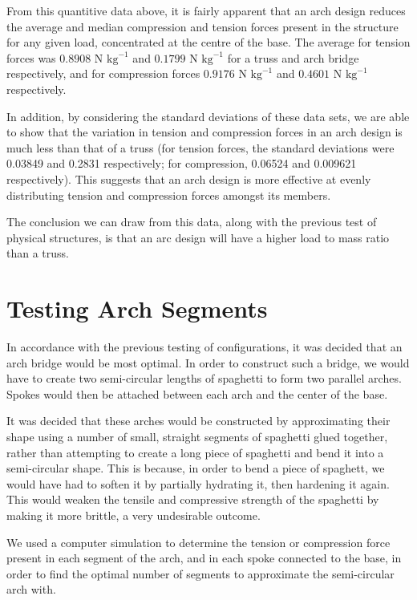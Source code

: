 \documentclass[a4paper,11pt]{article}
\begin{document}
From this quantitive data above, it is fairly apparent that an arch design
reduces the average and median compression and tension forces present in the
structure for any given load, concentrated at the centre of the base. The
average for tension forces was $0.8908\mbox{ N kg}^{-1}$ and
$0.1799\mbox{ N kg}^{-1}$ for a truss and arch bridge respectively, and for
compression forces $0.9176\mbox{ N kg}^{-1}$ and $0.4601\mbox{ N kg}^{-1}$
respectively.

In addition, by considering the standard deviations of these data sets, we are
able to show that the variation in tension and compression forces in an arch
design is much less than that of a truss (for tension forces, the standard
deviations were 0.03849 and 0.2831 respectively; for compression, 0.06524 and
0.009621 respectively).
This suggests that an arch design is more effective at evenly distributing
tension and compression forces amongst its members.

The conclusion we can draw from this data, along with the previous test of
physical structures, is that an arc design will have a higher load to mass ratio
than a truss.




\section{Testing Arch Segments}

In accordance with the previous testing of configurations, it was decided that
an arch bridge would be most optimal.
In order to construct such a bridge, we would have to create two semi-circular
lengths of spaghetti to form two parallel arches. Spokes would then be attached
between each arch and the center of the base.

It was decided that these arches would be constructed by approximating their
shape using a number of small, straight segments of spaghetti glued together,
rather than attempting to create a long piece of spaghetti and bend it into a
semi-circular shape.
This is because, in order to bend a piece of spaghett, we would have had to
soften it by partially hydrating it, then hardening it again.
This would weaken the tensile and compressive strength of the spaghetti by
making it more brittle, a very undesirable outcome.

We used a computer simulation to determine the tension or compression force
present in each segment of the arch, and in each spoke connected to the base,
in order to find the optimal number of segments to approximate the
semi-circular arch with.
\end{document}
